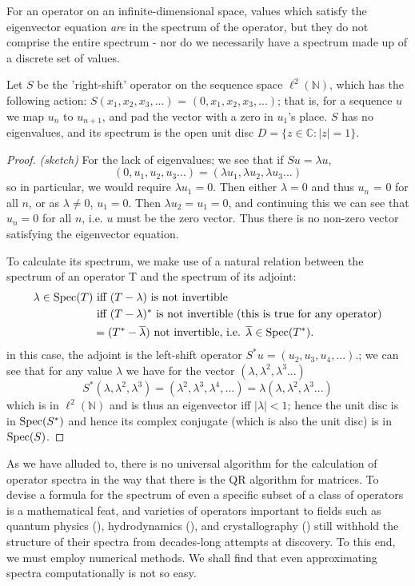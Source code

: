 \documentclass[../main.tex]{subfiles}
\begin{document}
For an operator on an
infinite-dimensional space, values which satisfy the eigenvector equation \emph{are} in the spectrum of the operator, but they do not
comprise the entire spectrum - nor do we necessarily have a spectrum made up of a discrete set of values.

\begin{example}
Let $S$ be the 'right-shift' operator on the sequence space $\ell^2(\mathbb{N})$, which has the following action:
$S(x_1, x_2, x_3, ...)$ = $(0, x_1, x_2, x_3, ...)$; that is, for a sequence $u$ we map $u_n$ to $u_{n+1}$, and pad the vector with a zero in $u_1$'s place.
$S$ has no eigenvalues, and its spectrum is the open unit disc $D = \{z \in \mathbb{C} : |z| = 1\}$.
\end{example}
\begin{proof}{\emph{(sketch)}}
For the lack of eigenvalues; we see that if $Su = \lambda u$, 
$$(0, u_1, u_2, u_3 ...) = (\lambda u_1, \lambda u_2, \lambda u_3 ...)$$
so in particular, we would require $\lambda u_1 = 0$. Then either $\lambda = 0$ and thus $u_n$ = 0 for all $n$, or as $\lambda \neq 0$, $u_1 =0$. Then $\lambda u_2 = u_1 = 0$, and continuing this we
can see that $u_n = 0$ for all $n$, i.e. $u$ must be the zero vector. Thus there is no non-zero vector satisfying the eigenvector equation.

To calculate its spectrum, we make use of a natural relation between the spectrum of an operator T and the spectrum of its adjoint: 
\begin{align*}
\lambda \in \mathrm{Spec}(T)  &\text{ iff } (T - \lambda)\text{ is not invertible }\\
& \text{ iff } (T - \lambda)^*\text{ is not invertible (this is true for any operator)}\\
& = (T^* - \overline{\lambda}) \text{ not invertible, i.e. } \overline{\lambda} \in \mathrm{Spec}(T^*).
\end{align*}
in this case, the adjoint is the left-shift operator $S^*u = (u_2, u_3, u_4, ...).$; we can see that for any value $\lambda$ we have for the vector
$(\lambda, \lambda^2, \lambda^3...)$
$$S^*(\lambda, \lambda^2, \lambda^3) = (\lambda^2, \lambda^3, \lambda^4, ...) = \lambda(\lambda, \lambda^2, \lambda^3...)$$
which is in $\ell^2(\mathbb{N})$ and is thus an eigenvector iff $|\lambda| < 1$; hence the unit disc is in $\mathrm{Spec}(S^*)$ and hence its
complex conjugate (which is also the unit disc) is in $\mathrm{Spec}(S)$.
\end{proof}

As we have alluded to, there is no universal algorithm for the calculation of operator spectra in the way that there is the QR algorithm \cite{suli2003introduction} for matrices. To devise a formula for the spectrum of even a specific subset of a class of operators is a mathematical
feat, and varieties of operators important to fields such as quantum physics (\cite{lewin2010spectral}), hydrodynamics (\cite{manning2008descriptor}), and crystallography (\cite{cances2012periodic}) still withhold the structure of their spectra from decades-long attempts at discovery. 
To this end, we must employ numerical methods.
We shall find that even approximating spectra computationally is not so easy.
\end{document}
